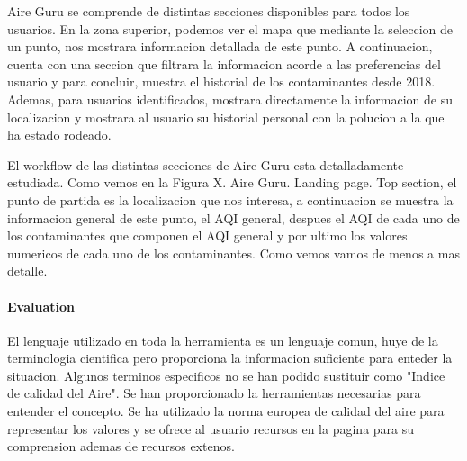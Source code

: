 Aire Guru se comprende de distintas secciones disponibles para todos los usuarios. En la zona superior, podemos ver el mapa que mediante la seleccion de un punto, nos
mostrara informacion detallada de este punto. A continuacion, cuenta con una seccion que filtrara la informacion acorde a las preferencias del usuario
y para concluir, muestra el historial de los contaminantes desde 2018.
Ademas, para usuarios identificados, mostrara directamente la informacion de su localizacion y mostrara al usuario su historial personal
con la polucion a la que ha estado rodeado.

El workflow de las distintas secciones de Aire Guru esta detalladamente estudiada. Como vemos en la Figura X. Aire Guru. Landing page. Top section, el punto de partida es la localizacion que nos interesa,
a continuacion se muestra la informacion general de este punto, el AQI general, despues el AQI de cada uno de los contaminantes que componen el 
AQI general y por ultimo los valores numericos de cada uno de los contaminantes. Como vemos vamos de menos a mas detalle.

\paragraph{Evaluation} \mbox{} 

\begin{itemize}
\done El lenguaje utilizado en toda la herramienta es un lenguaje comun, huye de la terminologia cientifica pero proporciona la informacion
suficiente para enteder la situacion.
\crossed Algunos terminos especificos no se han podido sustituir como "Indice de calidad del Aire".
\done Se han proporcionado la herramientas necesarias para entender el concepto. Se ha utilizado la norma europea de calidad del aire para 
representar los valores y se ofrece al usuario recursos en la pagina para su comprension ademas de recursos extenos.
\end{itemize}

\newpage